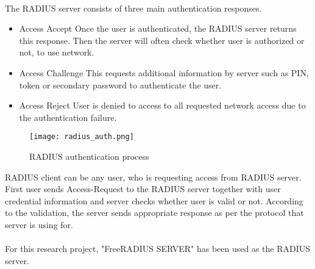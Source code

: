  \paragraph{}
 The RADIUS server consists of three main authentication responses.
 
 	\begin{itemize}
 		\item Access Accept
 			\subitem Once the user is authenticated, the RADIUS server returns this response. Then the server will often check whether user is authorized or not, to use network. 
 		\item Access Challenge
 			\subitem This requests additional information by server such as PIN, token or secondary password to authenticate the user.
 		\item Access Reject
 			\subitem User is denied to access to all requested network access due to the authentication failure.
 	\end{itemize}
 
 \begin{figure*}[h]	
 	\centering
 	\texttt{[image: radius\_auth.png]}
 	\caption{RADIUS authentication process}
 \end{figure*}
 
 RADIUS client can be any user, who is requesting access from RADIUS server. First user sends Access-Request to the RADIUS server together with user credential information and server checks whether user is valid or not. According to the validation, the server sends appropriate response as per the protocol that server is using for.
 
 \paragraph{}
 For this research project, "FreeRADIUS SERVER" has been used as the RADIUS server.
 
